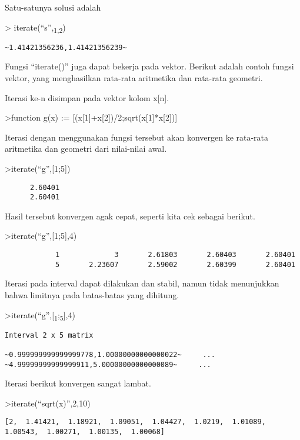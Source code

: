 \documentclass[
]{book}
\begin{document}
Satu-satunya solusi adalah

\textgreater{} iterate(``s'',\textsubscript{1,2})

\begin{verbatim}
~1.41421356236,1.41421356239~
\end{verbatim}

Fungsi ``iterate()'' juga dapat bekerja pada vektor. Berikut adalah contoh fungsi vektor, yang menghasilkan rata-rata aritmetika dan rata-rata geometri.

Iterasi ke-n disimpan pada vektor kolom x{[}n{]}.

\textgreater function g(x) := {[}(x{[}1{]}+x{[}2{]})/2;sqrt(x{[}1{]}*x{[}2{]}){]}

Iterasi dengan menggunakan fungsi tersebut akan konvergen ke rata-rata aritmetika dan geometri dari nilai-nilai awal.

\textgreater iterate(``g'',{[}1;5{]})

\begin{verbatim}
      2.60401 
      2.60401 
\end{verbatim}

Hasil tersebut konvergen agak cepat, seperti kita cek sebagai berikut.

\textgreater iterate(``g'',{[}1;5{]},4)

\begin{verbatim}
            1             3       2.61803       2.60403       2.60401 
            5       2.23607       2.59002       2.60399       2.60401 
\end{verbatim}

Iterasi pada interval dapat dilakukan dan stabil, namun tidak menunjukkan bahwa limitnya pada batas-batas yang dihitung.

\textgreater iterate(``g'',{[}\textsubscript{1};\textsubscript{5}{]},4)

\begin{verbatim}
Interval 2 x 5 matrix

~0.999999999999999778,1.00000000000000022~     ...
~4.99999999999999911,5.00000000000000089~     ...
\end{verbatim}

Iterasi berikut konvergen sangat lambat.

\textgreater iterate(``sqrt(x)'',2,10)

\begin{verbatim}
[2,  1.41421,  1.18921,  1.09051,  1.04427,  1.0219,  1.01089,
1.00543,  1.00271,  1.00135,  1.00068]
\end{verbatim}
\end{document}

